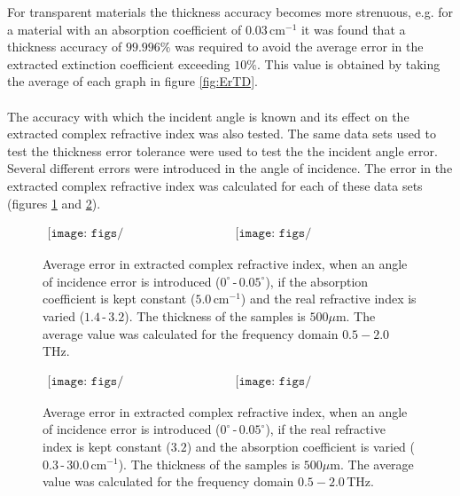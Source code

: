 For transparent materials the thickness accuracy becomes more strenuous, e.g. for a material with an absorption coefficient of $0.03\,\text{cm}^{-1}$ it was found that a thickness accuracy of $99.996\%$ was required to avoid the average error in the extracted extinction coefficient exceeding $10\%$. This value is obtained by taking the average of each graph in figure \ref{fig:ErTD}.
\paragraph{}
The accuracy with which the incident angle is known and its effect on the extracted complex refractive index was also tested. The same data sets used to test the thickness error tolerance were used to test the the incident angle error. Several different errors were introduced in the angle of incidence. The error in the extracted complex refractive index was calculated for each of these data sets (figures \ref{fig:ErNA} and \ref{fig:ErKA}).

\begin{figure}[H]
                \begin{center}$
								\begin{array}{cc}
                \texttt{[image: figs/n\_err\_a\_shift\_n\_change.png]}&
                \texttt{[image: figs/k\_err\_a\_shift\_n\_change.png]}
								\end{array}$
								\end{center}
	\caption[Error in extracted complex refractive index for constant absorption coefficient, varied real refractive index and multiple incident angle errors]{Average error in extracted complex refractive index, when an angle of incidence error is introduced ($0^{\circ}\,$-$\,0.05^{\circ}$), if the absorption coefficient is kept constant ($5.0\,\text{cm}^{-1}$) and the real refractive index is varied ($1.4\,$-$\,3.2$). The thickness of the samples is $500\mu$m. The average value was calculated for the frequency domain $0.5-2.0\,$THz.}
	\label{fig:ErNA}
\end{figure}

\begin{figure}[H]
                \begin{center}$
								\begin{array}{cc}
                \texttt{[image: figs/n\_err\_a\_shift\_k\_change.png]}&
                \texttt{[image: figs/k\_err\_a\_shift\_k\_change.png]}
								\end{array}$
								\end{center}
	\caption[Error in extracted complex refractive index for constant real refractive index, varied absorption coefficient and multiple incident angle errors]{Average error in extracted complex refractive index, when an angle of incidence error is introduced ($0^{\circ}\,$-$\,0.05^{\circ}$), if the real refractive index is kept constant ($3.2$) and the absorption coefficient is varied ($0.3\,$-$\,30.0\,\text{cm}^{-1}$). The thickness of the samples is $500\mu$m. The average value was calculated for the frequency domain $0.5-2.0\,$THz.}
	\label{fig:ErKA}
\end{figure}

